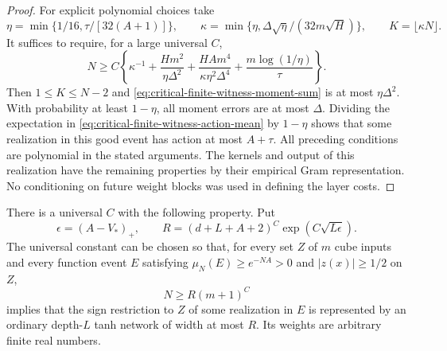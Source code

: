 \begin{proof}
For explicit polynomial choices take
\[
 \eta=\min\{1/16,\tau/[32(A+1)]\},\qquad
 \kappa=\min\{\eta,\Delta\sqrt\eta/(32m\sqrt H)\},
 \qquad K=\lfloor\kappa N\rfloor.
\]
It suffices to require, for a large universal $C$,
\[
 N\ge C\left\{\kappa^{-1}
       +\frac{Hm^2}{\eta\Delta^2}
       +\frac{HA m^4}{\kappa\eta^2\Delta^4}
       +\frac{m\log(1/\eta)}\tau\right\}.
\]
Then $1\le K\le N-2$ and
\eqref{eq:critical-finite-witness-moment-sum} is at most
$\eta\Delta^2$. With probability at least $1-\eta$, all moment
errors are at most $\Delta$. Dividing the expectation in
\eqref{eq:critical-finite-witness-action-mean} by $1-\eta$ shows that
some realization in this good event has action at most $A+\tau$.
All preceding conditions are polynomial in the stated arguments.
The kernels and output of this realization have the remaining
properties by their empirical Gram representation. No conditioning
on future weight blocks was used in defining the layer costs.
\end{proof}

\begin{theorem}
\label{thm:critical-finite-witness-compression}
There is a universal $C$ with the following property. Put
\[
 \epsilon=(A-V_*)_+,\qquad
 R=(d+L+A+2)^C\exp(C\sqrt{L\epsilon}).
\]
The universal constant can be chosen so that, for every set $Z$ of
$m$ cube inputs and every function event $E$ satisfying
$\mu_N(E)\ge e^{-NA}>0$ and $|z(x)|\ge1/2$ on $Z$,
\[
 N\ge R(m+1)^C
\]
implies that the sign restriction to $Z$ of some realization in $E$
is represented by an ordinary depth-$L$ tanh network of width at most
$R$. Its weights are arbitrary finite real numbers.
\end{theorem}

